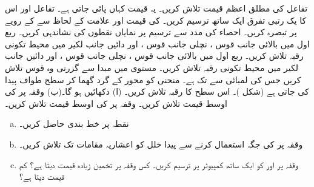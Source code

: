 تفاعل  کی مطلق اعظم قیمت تلاش کریں۔ یہ قیمت کہاں پائی جاتی ہے۔
تفاعل  اور اس کا یک  رتبی تفرق ایک ساتھ ترسیم کریں۔  کی قیمت اور علامت کے لحاظ سے  کے رویے  پر تبصرہ کریں۔ احصاء کی مدد سے ترسیم پر نمایاں نقطوں کی نشاندہی کریں۔
ربع اول میں بالائی جانب قوس ، نچلی جانب قوس ،  اور دائیں جانب لکیر  میں محیط تکونی رقبہ تلاش کریں۔ 
ربع اول میں بالائی جانب قوس ، نچلی جانب قوس ،  اور دائیں جانب لکیر  میں محیط تکونی رقبہ تلاش کریں۔ 
مستوی  میں مبدا سے گزرتی وہ قوس  تلاش کریں جس کی لمبائی  سے  تک  ہے۔
منحنی  کو محور  کے گرد گھما کر سطح طواف پیدا کی جاتی ہے (شکل )۔ اس سطح کا رقبہ تلاش کریں۔
(ا) دکھائیں  ہو گا۔(ب) وقفہ  پر  کی اوسط قیمت تلاش کریں۔
وقفہ  پر  کی اوسط قیمت تلاش کریں۔
\\
\begin{enumerate}[a.]
\item
نقطہ  پر خط بندی  حاصل کریں۔
\item
وقفہ  پر  کی جگہ  استعمال کرنے سے پیدا خلل کو  اعشاریہ  مقامات تک تلاش کریں۔
\item
وقفہ  پر  اور  کو ایک ساتھ کمپیوٹر پر ترسیم کریں۔ کس وقفہ پر تخمین زیادہ قیمت دیتا ہے؟  کم قیمت دیتا ہے؟
\end{enumerate}
